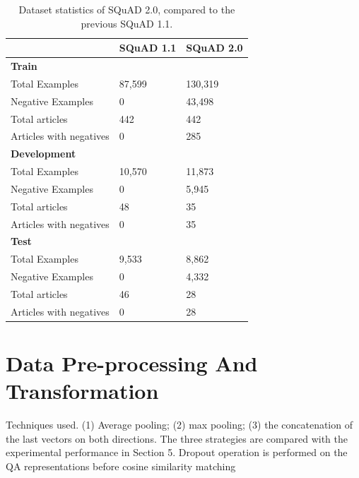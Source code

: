 \documentclass[12pt]{report}
\begin{document}
 \begin{table}[h!]
              \centering
                \begin{tabular}{|l|l|l|}
                    \hline
                     & SQuAD 1.1 &  SQuAD 2.0 \\
                    \hline
                    \textbf{Train} & & \\
                        Total Examples & 87,599 &  130,319 \\
                        Negative Examples & 0 & 43,498 \\
                        Total articles & 442 & 442 \\
                        Articles with negatives & 0 & 285 \\
                    \hline
                    \textbf{Development} & & \\
                        Total Examples & 10,570 &  11,873 \\
                        Negative Examples & 0 & 5,945 \\
                        Total articles & 48 & 35 \\
                        Articles with negatives & 0 & 35 \\
                    \hline
                    \textbf{Test} &  & \\
                        Total Examples & 9,533 & 8,862 \\
                        Negative Examples & 0 & 4,332 \\
                        Total articles & 46 & 28 \\
                        Articles with negatives & 0 & 28 \\
                    \hline
                \end{tabular}
                \caption{Dataset statistics of SQuAD 2.0, compared to the previous SQuAD 1.1\citep{dataset}.}\label{datasetDescription}
            \end{table}

    \section{Data Pre-processing And Transformation}\label{c32}
    Techniques used.
    (1) Average pooling; (2) max pooling; (3) the concatenation of the last
    vectors on both directions. The three strategies are compared with the experimental performance
    in Section 5. Dropout operation is performed on the QA representations before cosine similarity
    matching
\end{document}
